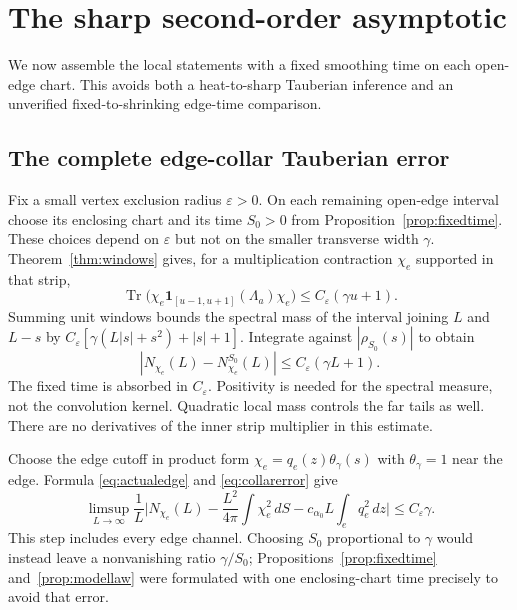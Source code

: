 \documentclass[11pt]{amsart}
\numberwithin{equation}{section}
\theoremstyle{remark}
\newcommand{\Tr}{\operatorname{Tr}}
\newcommand{\one}{\mathbf{1}}
\begin{document}
\section{The sharp second-order asymptotic}\label{sec:sharp}

We now assemble the local statements with a fixed smoothing time on each open-edge chart. This avoids both a heat-to-sharp Tauberian inference and an unverified fixed-to-shrinking edge-time comparison.

\subsection{The complete edge-collar Tauberian error}
Fix a small vertex exclusion radius $\varepsilon>0$. On each remaining open-edge interval choose its enclosing chart and its time $S_0>0$ from Proposition~\ref{prop:fixedtime}. These choices depend on $\varepsilon$ but not on the smaller transverse width $\gamma$. Theorem~\ref{thm:windows} gives, for a multiplication contraction $\chi_e$ supported in that strip,
\begin{equation}\label{eq:unitwindow}
\Tr\big(\chi_e\one_{[u-1,u+1]}(\Lambda_a)\chi_e\big)\le C_\varepsilon(\gamma u+1) .
\end{equation}
Summing unit windows bounds the spectral mass of the interval joining $L$ and $L-s$ by $C_\varepsilon[\gamma(L|s|+s^2)+|s|+1]$. Integrate against $|\rho_{S_0}(s)|$ to obtain
\begin{equation}\label{eq:collarerror}
|N_{\chi_e}(L)-N^{S_0}_{\chi_e}(L)|\le C_\varepsilon(\gamma L+1) .
\end{equation}
The fixed time is absorbed in $C_\varepsilon$. Positivity is needed for the spectral measure, not the convolution kernel. Quadratic local mass controls the far tails as well. There are no derivatives of the inner strip multiplier in this estimate.

Choose the edge cutoff in product form $\chi_e=q_e(z)\theta_\gamma(s)$ with $\theta_\gamma=1$ near the edge. Formula \eqref{eq:actualedge} and \eqref{eq:collarerror} give
\begin{equation}\label{eq:edgelimsup}
\limsup_{L\to\infty}\frac1L\Big|N_{\chi_e}(L)-\frac{L^2}{4\pi}\int\chi_e^2\,dS-c_{\alpha_0}L\int_eq_e^2\,dz\Big|\le C_\varepsilon\gamma .
\end{equation}
This step includes every edge channel. Choosing $S_0$ proportional to $\gamma$ would instead leave a nonvanishing ratio $\gamma/S_0$; Propositions~\ref{prop:fixedtime} and~\ref{prop:modellaw} were formulated with one enclosing-chart time precisely to avoid that error.
\end{document}
